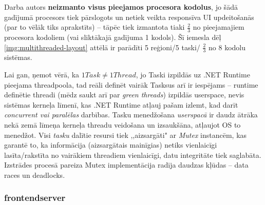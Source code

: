 Darba autors \textbf{neizmanto visus pieejamos procesora kodolus}, jo šādā gadījumā
procesors tiek pārslogots un netiek veikta responsīva UI updeitošanās (par to
vēlāk tiks aprakstīts) -- tāpēc tiek izmantota tiaki \(\frac{2}{3}\) no
pieejamajiem procesora kodoliem (vai sliktākajā gadījuma 1 kodols). Šī iemesla dēļ
\ref{img:multithreaded-layout} attēlā ir parādīti 5 reģioni/5 taski/ \(\frac{2}{3}\) no 8 kodolu sistēmas.

Lai gan, ņemot vērā, ka \(1 Task\neq 1 Thread\), jo Taski izpildās uz .NET Runtime
pieejama threadpoola\cite{csharp:tasks-not-threads}, tad reāli definēt vairāk
Tasksus arī ir iespējams -- runtime definētie threadi (mēdz saukt arī par
\emph{green threads}\cite{progr:green-threads}) izpildās
userspace\cite{sys:userspace}, nevis sistēmas kerneļa līmenī, kas .NET Runtime
atļauj pašam izlemt, kad darīt \emph{concurrent vai paralēlas}\cite{csharp:concurrent-parallel} darbības.
Tasku menedžošana
\emph{userspacā} ir daudz ātrāka nekā zemā līmeņa kerneļa threadu veidošana un izsaukšāna, atļaujot OS to menedžot.
Visi \emph{tasku} dalītie resursi tiek ,,aizsargāti" ar \emph{Mutex}\cite{csharp:mutex}
instancēm, kas garantē to, ka informācija (aizsargātais mainīgias) netiks vienlaicīgi lasīta/rakstīta no
vairākiem threadiem vienlaicīgi, datu integritāte tiek saglabāta. Izstrādes procesā
pareiza Mutex implementācija radīja daudzas kļūdas -- data races un deadlocks.



\subsubsection{frontendserver}

